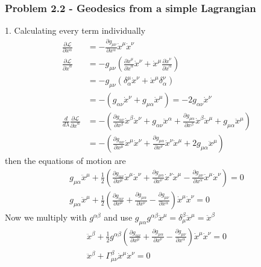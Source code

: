 \documentclass[10pt,a4paper]{book}
\theoremstyle{definition}
\begin{document}
\subsubsection{Problem 2.2 - Geodesics from a simple Lagrangian}
1. Calculating every term individually
\begin{align}
\frac{\partial\mathcal{L}}{\partial x^\alpha}
&=-\frac{\partial g_{\mu\nu}}{\partial x^\alpha}\dot{x}^\mu\dot{x}^\nu\\
\frac{\partial\mathcal{L}}{\partial \dot{x}^\alpha}
&=-g_{\mu\nu}\left(\frac{\partial\dot{x}^\mu}{\partial\dot{x}^\alpha}\dot{x}^\nu+\dot{x}^\mu\frac{\partial\dot{x}^\nu}{\partial\dot{x}^\alpha}\right)\\
&=-g_{\mu\nu}\left(\delta^\mu_\alpha\dot{x}^\nu+\dot{x}^\mu\delta^\nu_\alpha\right)\\
&=-(g_{\alpha\nu}\dot{x}^\nu+g_{\mu\alpha}\dot{x}^\mu)=-2g_{\alpha\nu}\dot{x}^\nu\\
\frac{d}{d\lambda}\frac{\partial\mathcal{L}}{\partial \dot{x}^\alpha}
&=-\left(\frac{\partial g_{\alpha\nu}}{\partial x^\beta}\dot{x}^\beta\dot{x}^\nu+g_{\alpha\nu}\ddot{x}^\alpha+\frac{\partial g_{\mu\alpha}}{\partial x^\beta}\dot{x}^\beta\dot{x}^\mu+g_{\mu\alpha}\ddot{x}^\mu\right)\\
&=-\left(\frac{\partial g_{\alpha\nu}}{\partial x^\mu}\dot{x}^\mu\dot{x}^\nu
+\frac{\partial g_{\mu\alpha}}{\partial x^\nu}\dot{x}^\nu\dot{x}^\mu
+2g_{\mu\alpha}\ddot{x}^\mu\right)
\end{align}
then the equations of motion are
\begin{align}
g_{\mu\alpha}\ddot{x}^\mu+\frac{1}{2}\left(\frac{\partial g_{\alpha\nu}}{\partial x^\mu}\dot{x}^\mu\dot{x}^\nu
+\frac{\partial g_{\mu\alpha}}{\partial x^\nu}\dot{x}^\nu\dot{x}^\mu-\frac{\partial g_{\mu\nu}}{\partial x^\alpha}\dot{x}^\mu\dot{x}^\nu\right)=0\\
g_{\mu\alpha}\ddot{x}^\mu+\frac{1}{2}\left(\frac{\partial g_{\alpha\nu}}{\partial x^\mu}
+\frac{\partial g_{\mu\alpha}}{\partial x^\nu}-\frac{\partial g_{\mu\nu}}{\partial x^\alpha}\right)\dot{x}^\mu\dot{x}^\nu=0
\end{align}
Now we multiply with $g^{\alpha\beta}$ and use $g_{\mu\alpha}g^{\alpha\beta}\ddot{x}^\mu=\delta^\beta_\mu\ddot{x}^\mu=\ddot{x}^\beta$
\begin{align}
\ddot{x}^\beta+\frac{1}{2}g^{\alpha\beta}\left(\frac{\partial g_{\alpha\nu}}{\partial x^\mu}
+\frac{\partial g_{\mu\alpha}}{\partial x^\nu}-\frac{\partial g_{\mu\nu}}{\partial x^\alpha}\right)\dot{x}^\mu\dot{x}^\nu=0\\
\ddot{x}^\beta+\Gamma^\beta_{\mu\nu}\dot{x}^\mu\dot{x}^\nu=0
\end{align}
\end{document}
